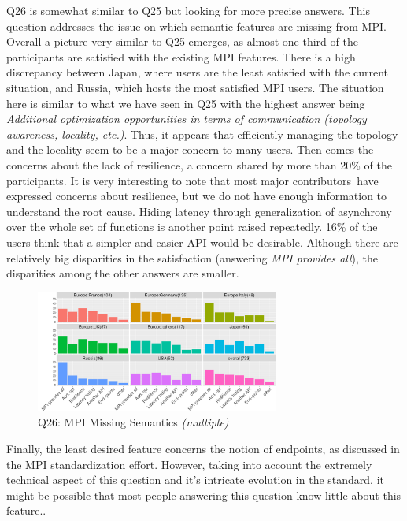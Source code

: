 \documentclass[preprint,5p,times]{elsarticle}
\def\myquote#1{{\it #1}}
\def\mcountries{major contributors\xspace{}}%
\begin{document}
Q26 is somewhat similar to Q25 but looking for more precise answers. This
question addresses the issue on which semantic features are missing from MPI.
Overall a picture very similar to Q25 emerges, as almost one third of the
participants are satisfied with the existing MPI features. There is a high
discrepancy between Japan, where users are the least satisfied with the current
situation, and Russia, which hosts the most satisfied MPI users.
%
The situation here is similar to what we have seen in Q25 with the highest answer
being \myquote{Additional optimization opportunities in terms of communication
(topology awareness, locality, etc.)}. Thus, it appears that efficiently
managing the topology and the locality seem to be a major concern to many users. Then
comes the concerns about the lack of resilience, a concern shared by more than
20\% of the participants. It is very interesting to note that most \mcountries\
have expressed concerns about resilience, but we do not have enough information
to understand the root cause. Hiding latency through generalization of
asynchrony over the whole set of functions is another point raised repeatedly.
16\% of the users think that a simpler and easier API would be desirable.
Although there are relatively big disparities in the satisfaction (answering
\myquote{MPI provides all}), the disparities among the other answers are smaller.

\begin{figure}[tb]
\begin{center}
\includegraphics[width=8.0cm]{R-scripts/Q26.pdf}
\vspace{-1.5mm}
\caption{Q26: MPI Missing Semantics {\it(multiple)}}
\label{fig:missing-semantics}
\vspace{-3mm}%
\end{center}
\end{figure}

Finally, the least desired feature concerns the notion of endpoints, as
discussed in the MPI standardization effort. However, taking into account the
extremely technical aspect of this question and it's intricate evolution in the
standard, it might be possible that most people answering this question know
little about this feature..
\end{document}
